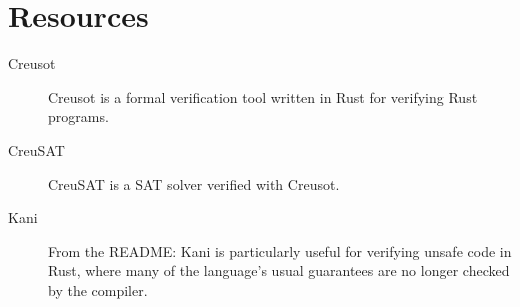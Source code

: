 \documentclass[12pt]{article}
\begin{document}

\section{Resources}

\begin{description}
  \item[Creusot] \cite{denisCreusot2023} \cite{denisCreusotFoundryDeductive2022}

    Creusot is a formal verification tool written in Rust for verifying Rust programs.
    
  \item[CreuSAT] \cite{skotamCreuSAT2023}

    CreuSAT is a SAT solver verified with Creusot.
    
  \item[Kani] \cite{Kani2023}

    From the README: Kani is particularly useful for verifying unsafe code in
    Rust, where many of the language's usual guarantees are no longer checked by
    the compiler.

\end{description}

\printbibliography
\end{document}

